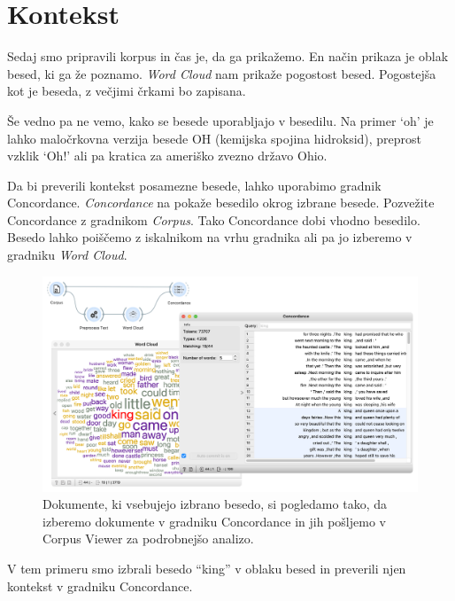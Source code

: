 \chapter{Kontekst}
\label{ch:kontekst}

Sedaj smo pripravili korpus in čas je, da ga prikažemo. En način prikaza je oblak besed, ki ga že poznamo. \textit{Word Cloud} nam prikaže pogostost besed. Pogostejša kot je beseda, z večjimi črkami bo zapisana.

Še vedno pa ne vemo, kako se besede uporabljajo v besedilu. Na primer ‘oh’ je lahko maločrkovna verzija besede OH (kemijska spojina hidroksid), preprost vzklik ‘Oh!’ ali pa kratica za ameriško zvezno državo Ohio.

Da bi preverili kontekst posamezne besede, lahko uporabimo gradnik Concordance. \textit{Concordance} na pokaže besedilo okrog izbrane besede.
Pozvežite Concordance z gradnikom \textit{Corpus}. Tako Concordance dobi vhodno besedilo. Besedo lahko poiščemo z iskalnikom na vrhu gradnika ali pa jo izberemo v gradniku \textit{Word Cloud}.

\begin{figure}[h]
  \includegraphics[width=\linewidth]{kontekst.png}%
  \caption{Dokumente, ki vsebujejo izbrano besedo, si pogledamo tako, da izberemo dokumente v gradniku Concordance in jih pošljemo v Corpus Viewer za podrobnejšo analizo. }
  \label{fig:003-kontekst}
\end{figure}

V tem primeru smo izbrali besedo ``king'' v oblaku besed in preverili njen kontekst v gradniku Concordance.